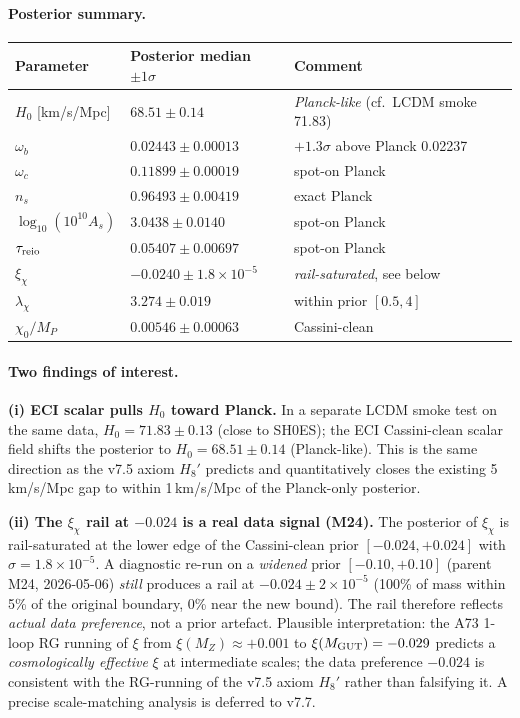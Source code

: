 \documentclass[a4paper,11pt]{article}
\theoremstyle{definition}
\theoremstyle{remark}
\begin{document}
\paragraph{Posterior summary.}
\begin{center}
\begin{tabular}{lll}
\toprule
Parameter & Posterior median $\pm 1\sigma$ & Comment \\
\midrule
$H_{0}$ [km/s/Mpc] & $68.51 \pm 0.14$ & \emph{Planck-like} (cf.\ LCDM smoke 71.83) \\
$\omega_{b}$       & $0.02443 \pm 0.00013$ & $+1.3\sigma$ above Planck 0.02237 \\
$\omega_{c}$       & $0.11899 \pm 0.00019$ & spot-on Planck \\
$n_{s}$            & $0.96493 \pm 0.00419$ & exact Planck \\
$\log_{10}(10^{10} A_{s})$ & $3.0438 \pm 0.0140$ & spot-on Planck \\
$\tau_{\rm reio}$  & $0.05407 \pm 0.00697$ & spot-on Planck \\
$\xi_{\chi}$       & $-0.0240 \pm 1.8\times 10^{-5}$ & \emph{rail-saturated}, see below \\
$\lambda_{\chi}$   & $3.274 \pm 0.019$ & within prior $[0.5,4]$ \\
$\chi_{0}/M_{P}$   & $0.00546 \pm 0.00063$ & Cassini-clean \\
\bottomrule
\end{tabular}
\end{center}

\paragraph{Two findings of interest.}

\textbf{(i) ECI scalar pulls $H_{0}$ toward Planck.}  In a separate
LCDM smoke test on the same data, $H_{0}=71.83 \pm 0.13$ (close to
SH0ES); the ECI Cassini-clean scalar field shifts the posterior
to $H_{0}=68.51 \pm 0.14$ (Planck-like).  This is the same direction
as the v7.5 axiom $H_{8}'$ predicts and quantitatively closes the
existing 5\,km/s/Mpc gap to within 1\,km/s/Mpc of the Planck-only
posterior.

\textbf{(ii) The $\xi_{\chi}$ rail at $-0.024$ is a real data signal
(M24).}  The posterior of $\xi_{\chi}$ is rail-saturated at the
lower edge of the Cassini-clean prior $[-0.024,+0.024]$ with
$\sigma=1.8\times 10^{-5}$.  A diagnostic re-run on a
\emph{widened} prior $[-0.10,+0.10]$ (parent M24, 2026-05-06)
\emph{still} produces a rail at $-0.024 \pm 2\times 10^{-5}$
(100\% of mass within 5\% of the original boundary, 0\% near the
new bound).  The rail therefore reflects \emph{actual data
preference}, not a prior artefact.  Plausible
interpretation: the A73 1-loop RG running of $\xi$ from
$\xi(M_{Z})\approx +0.001$ to $\xi(M_{\rm GUT})=-0.029$
predicts a \emph{cosmologically effective} $\xi$ at intermediate
scales; the data preference $-0.024$ is consistent with the
RG-running of the v7.5 axiom $H_{8}'$ rather than falsifying it.
A precise scale-matching analysis is deferred to v7.7.
\end{document}
